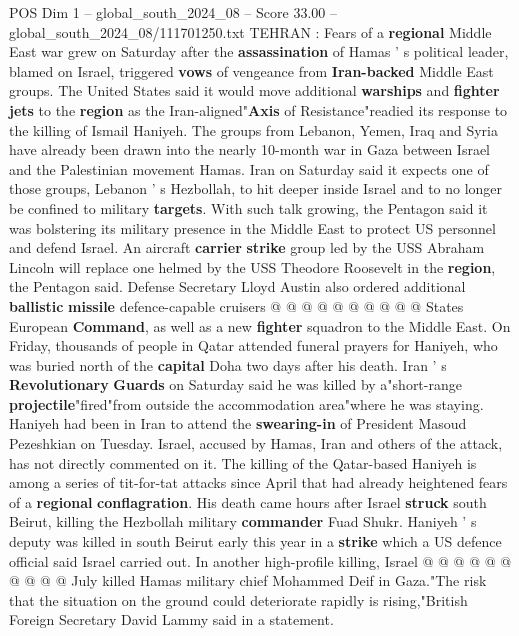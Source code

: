 \begin{textsample}{POS Dim 1 – global\_south\_2024\_08 – Score 33.00 – global\_south\_2024\_08/111701250.txt}  \label{ex:f1_pos_005}
TEHRAN : Fears of a \textbf{regional} Middle East war grew on Saturday after the \textbf{assassination} of Hamas ' s political leader, blamed on Israel, triggered \textbf{vows} of vengeance from \textbf{Iran-backed} Middle East groups.
The United States said it would move additional \textbf{warships} and \textbf{fighter} \textbf{jets} to the \textbf{region} as the Iran-aligned"\textbf{Axis} of Resistance"readied its response to the killing of Ismail Haniyeh.
The groups from Lebanon, Yemen, Iraq and Syria have already been drawn into the nearly 10-month war in Gaza between Israel and the Palestinian movement Hamas.
Iran on Saturday said it expects one of those groups, Lebanon ' s Hezbollah, to hit deeper inside Israel and to no longer be confined to military \textbf{targets}.
With such talk growing, the Pentagon said it was bolstering its military presence in the Middle East to protect US personnel and defend Israel.
An aircraft \textbf{carrier} \textbf{strike} group led by the USS Abraham Lincoln will replace one helmed by the USS Theodore Roosevelt in the \textbf{region}, the Pentagon said.
Defense Secretary Lloyd Austin also ordered additional \textbf{ballistic} \textbf{missile} defence-capable cruisers @ @ @ @ @ @ @ @ @ @ States European \textbf{Command}, as well as a new \textbf{fighter} squadron to the Middle East.
On Friday, thousands of people in Qatar attended funeral prayers for Haniyeh, who was buried north of the \textbf{capital} Doha two days after his death.
Iran ' s \textbf{Revolutionary} \textbf{Guards} on Saturday said he was killed by a"short-range \textbf{projectile}"fired"from outside the accommodation area"where he was staying.
Haniyeh had been in Iran to attend the \textbf{swearing-in} of President Masoud Pezeshkian on Tuesday.
Israel, accused by Hamas, Iran and others of the attack, has not directly commented on it.
The killing of the Qatar-based Haniyeh is among a series of tit-for-tat attacks since April that had already heightened fears of a \textbf{regional} \textbf{conflagration}.
His death came hours after Israel \textbf{struck} south Beirut, killing the Hezbollah military \textbf{commander} Fuad Shukr.
Haniyeh ' s deputy was killed in south Beirut early this year in a \textbf{strike} which a US defence official said Israel carried out.
In another high-profile killing, Israel @ @ @ @ @ @ @ @ @ @ July killed Hamas military chief Mohammed Deif in Gaza."The risk that the situation on the ground could deteriorate rapidly is rising,"British Foreign Secretary David Lammy said in a statement.

\end{textsample}
